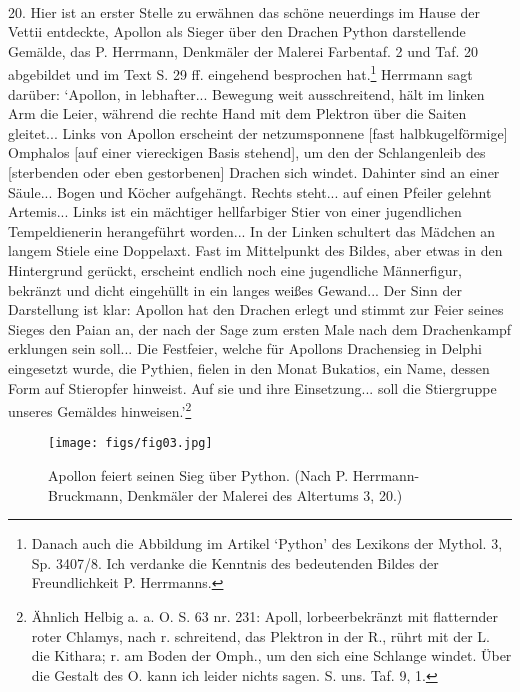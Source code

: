 \documentclass[a4paper, 11pt, oneside]{article}
\begin{document}
\paragraph{}
20. Hier ist an erster Stelle zu erwähnen das schöne neuerdings im Hause der Vettii entdeckte, Apollon als Sieger über den Drachen Python darstellende Gemälde, das P. Herrmann, Denkmäler der Malerei Farbentaf. 2 und Taf. 20 abgebildet und im Text S. 29 ff. eingehend besprochen hat.\footnote{Danach auch die Abbildung im Artikel `Python' des Lexikons der Mythol. 3, Sp. 3407/8. Ich verdanke die Kenntnis des bedeutenden Bildes der Freundlichkeit P. Herrmanns.} Herrmann sagt darüber: `Apollon, in lebhafter... Bewegung weit ausschreitend, hält im linken Arm die Leier, während die rechte Hand mit dem Plektron über die Saiten gleitet... Links von Apollon erscheint der netzumsponnene [fast halbkugelförmige] Omphalos [auf einer viereckigen Basis stehend], um den der Schlangenleib des [sterbenden oder eben gestorbenen] Drachen sich windet. Dahinter sind an einer Säule... Bogen und Köcher aufgehängt. Rechts steht... auf einen Pfeiler gelehnt Artemis... Links ist ein mächtiger hellfarbiger Stier von einer jugendlichen Tempeldienerin herangeführt worden... In der Linken schultert das Mädchen an langem Stiele eine Doppelaxt. Fast im Mittelpunkt des Bildes, aber etwas in den Hintergrund gerückt, erscheint endlich noch eine jugendliche Männerfigur, bekränzt und dicht eingehüllt in ein langes weißes Gewand... Der Sinn der Darstellung ist klar: Apollon hat den Drachen erlegt und stimmt zur Feier seines Sieges den Paian an, der nach der Sage zum ersten Male nach dem Drachenkampf erklungen sein soll... Die Festfeier, welche für Apollons Drachensieg in Delphi eingesetzt wurde, die Pythien, fielen in den Monat Bukatios, ein Name, dessen Form auf Stieropfer hinweist. Auf sie und ihre Einsetzung... soll die Stiergruppe unseres Gemäldes hinweisen.'\footnote{Ähnlich Helbig a. a. O. S. 63 nr. 231: Apoll, lorbeerbekränzt mit flatternder roter Chlamys, nach r. schreitend, das Plektron in der R., rührt mit der L. die Kithara; r. am Boden der Omph., um den sich eine Schlange windet. Über die Gestalt des O. kann ich leider nichts sagen. S. uns. Taf. 9, 1.}

\begin{figure}[H]
\centering
\texttt{[image: figs/fig03.jpg]}
\caption*{\swabfamily Apollon feiert seinen Sieg über Python. (Nach P. Herrmann-Bruckmann, Denkmäler der Malerei des Altertums 3, 20.)}
\end{figure}
\end{document}
